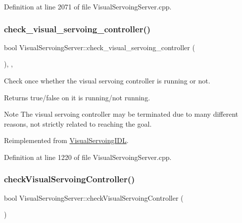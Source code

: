 Definition at line 2071 of file Visual\+Servoing\+Server.\+cpp.

\mbox{\label{classVisualServoingServer_a17a9b2913815c52b5a1bd2fd84d9f18e}} 
\subsubsection{\texorpdfstring{check\+\_\+visual\+\_\+servoing\+\_\+controller()}{check\_visual\_servoing\_controller()}}
{\footnotesize\ttfamily bool Visual\+Servoing\+Server\+::check\+\_\+visual\+\_\+servoing\+\_\+controller (\begin{DoxyParamCaption}{ }\end{DoxyParamCaption})\hspace{0.3cm}{\ttfamily [override]}, {\ttfamily [protected]}, {\ttfamily [virtual]}}



Check once whether the visual servoing controller is running or not. 

\begin{DoxyReturn}{Returns}
true/false on it is running/not running. 
\end{DoxyReturn}
\begin{DoxyNote}{Note}
The visual servoing controller may be terminated due to many different reasons, not strictly related to reaching the goal. 
\end{DoxyNote}


Reimplemented from \hyperlink{classVisualServoingIDL_a6426bda1341487c0dbb1f6a048a45deb}{Visual\+Servoing\+I\+DL}.



Definition at line 1220 of file Visual\+Servoing\+Server.\+cpp.

\mbox{\label{classVisualServoingServer_afa417f05dd02d2e91ff2c848f082a33b}} 
\subsubsection{\texorpdfstring{check\+Visual\+Servoing\+Controller()}{checkVisualServoingController()}}
{\footnotesize\ttfamily bool Visual\+Servoing\+Server\+::check\+Visual\+Servoing\+Controller (\begin{DoxyParamCaption}{ }\end{DoxyParamCaption})\hspace{0.3cm}{\ttfamily [override]}}



